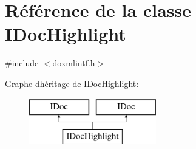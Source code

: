 \hypertarget{class_i_doc_highlight}{}\section{Référence de la classe I\+Doc\+Highlight}
\label{class_i_doc_highlight}


{\ttfamily \#include $<$doxmlintf.\+h$>$}

Graphe d\textquotesingle{}héritage de I\+Doc\+Highlight\+:\begin{figure}[H]
\begin{center}
\leavevmode
\includegraphics[height=2.000000cm]{class_i_doc_highlight}
\end{center}
\end{figure}
